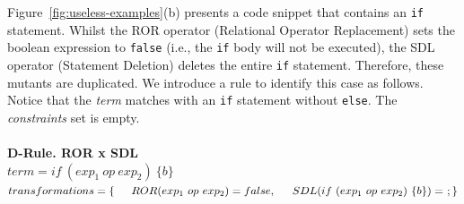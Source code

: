 Figure~\ref{fig:useless-examples}(b) presents a code snippet that contains an \texttt{if} statement. Whilst the ROR operator (Relational Operator Replacement) sets the boolean expression to \texttt{false} (i.e., the \texttt{if} body will not be executed), the SDL operator (Statement Deletion) deletes the entire \texttt{if} statement. Therefore, these mutants are duplicated. We introduce a rule to identify this case as follows. Notice that the \textit{term} matches with an \texttt{if} statement without \texttt{else}. The \textit{constraints} set is empty.
\\
\\
\textbf{D-Rule. ROR x SDL}\\
$term = if~(exp_1~op~exp_2)~\{b\} $\\
$transformations = \{\\ \indent ROR(exp_1~op~exp_2) = false, \\ \indent SDL(if~(exp_1~op~exp_2)~\{b\}) =~; \\ \}$\\

